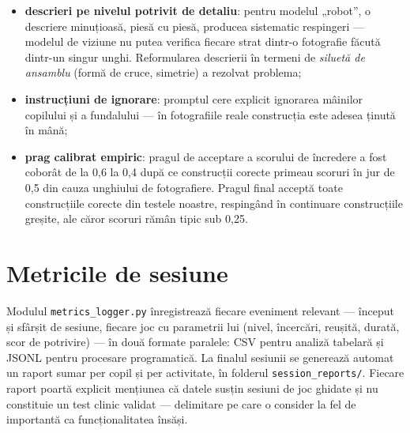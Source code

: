 \begin{itemize}
    \item \textbf{descrieri pe nivelul potrivit de detaliu}: pentru modelul „robot”, o descriere minuțioasă, piesă cu piesă, producea sistematic respingeri — modelul de viziune nu putea verifica fiecare strat dintr-o fotografie făcută dintr-un singur unghi. Reformularea descrierii în termeni de \emph{siluetă de ansamblu} (formă de cruce, simetrie) a rezolvat problema;
    \item \textbf{instrucțiuni de ignorare}: promptul cere explicit ignorarea mâinilor copilului și a fundalului — în fotografiile reale construcția este adesea ținută în mână;
    \item \textbf{prag calibrat empiric}: pragul de acceptare a scorului de încredere a fost coborât de la 0,6 la 0,4 după ce construcții corecte primeau scoruri în jur de 0,5 din cauza unghiului de fotografiere. Pragul final acceptă toate construcțiile corecte din testele noastre, respingând în continuare construcțiile greșite, ale căror scoruri rămân tipic sub 0,25.
\end{itemize}

\section{Metricile de sesiune}

Modulul \texttt{metrics\_logger.py} înregistrează fiecare eveniment relevant — început și sfârșit de sesiune, fiecare joc cu parametrii lui (nivel, încercări, reușită, durată, scor de potrivire) — în două formate paralele: CSV pentru analiză tabelară și JSONL pentru procesare programatică. La finalul sesiunii se generează automat un raport sumar per copil și per activitate, în folderul \texttt{session\_reports/}. Fiecare raport poartă explicit mențiunea că datele susțin sesiuni de joc ghidate și nu constituie un test clinic validat — delimitare pe care o consider la fel de importantă ca funcționalitatea însăși.
